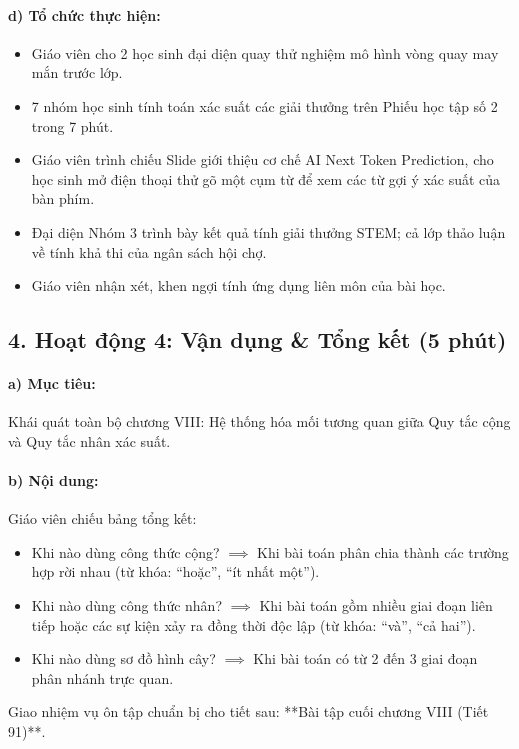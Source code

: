 \documentclass[12pt, a4paper]{article}
\begin{document}
\paragraph{d) Tổ chức thực hiện:}
\begin{itemize}[leftmargin=0.8cm]
    \item Giáo viên cho 2 học sinh đại diện quay thử nghiệm mô hình vòng quay may mắn trước lớp.
    \item 7 nhóm học sinh tính toán xác suất các giải thưởng trên Phiếu học tập số 2 trong 7 phút.
    \item Giáo viên trình chiếu Slide giới thiệu cơ chế AI Next Token Prediction, cho học sinh mở điện thoại thử gõ một cụm từ để xem các từ gợi ý xác suất của bàn phím.
    \item Đại diện Nhóm 3 trình bày kết quả tính giải thưởng STEM; cả lớp thảo luận về tính khả thi của ngân sách hội chợ.
    \item Giáo viên nhận xét, khen ngợi tính ứng dụng liên môn của bài học.
\end{itemize}

\subsection*{4. Hoạt động 4: Vận dụng \& Tổng kết (5 phút)}

\paragraph{a) Mục tiêu:} Khái quát toàn bộ chương VIII: Hệ thống hóa mối tương quan giữa Quy tắc cộng và Quy tắc nhân xác suất.

\paragraph{b) Nội dung:} Giáo viên chiếu bảng tổng kết:
\begin{itemize}[leftmargin=0.6cm]
    \item Khi nào dùng công thức cộng? $\implies$ Khi bài toán phân chia thành các trường hợp rời nhau (từ khóa: ``hoặc'', ``ít nhất một'').
    \item Khi nào dùng công thức nhân? $\implies$ Khi bài toán gồm nhiều giai đoạn liên tiếp hoặc các sự kiện xảy ra đồng thời độc lập (từ khóa: ``và'', ``cả hai'').
    \item Khi nào dùng sơ đồ hình cây? $\implies$ Khi bài toán có từ 2 đến 3 giai đoạn phân nhánh trực quan.
\end{itemize}
Giao nhiệm vụ ôn tập chuẩn bị cho tiết sau: **Bài tập cuối chương VIII (Tiết 91)**.
\end{document}
